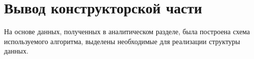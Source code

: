 

\section{Вывод конструкторской части}\label{KonstructResult}

На основе данных, полученных в аналитическом разделе, была построена схема используемого алгоритма,
выделены необходимые для реализации структуры данных.

